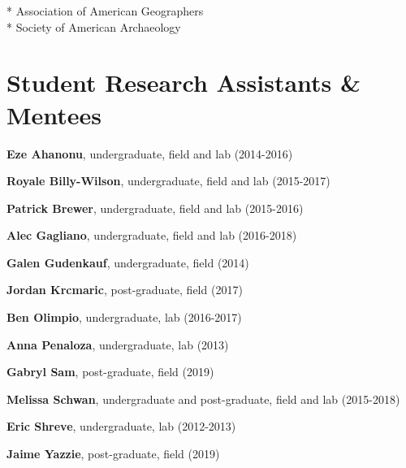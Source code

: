 \documentclass[11pt,a4paper,]{moderncv}
\begin{document}
\hspace*{0.333em}\hspace*{0.333em}\hspace*{0.333em}\hspace*{0.333em}\hspace*{0.333em}\hspace*{0.333em}\hspace*{0.333em}\hspace*{0.333em}\hspace*{0.333em}\hspace*{0.333em}*
Association of American Geographers\\
\hspace*{0.333em}\hspace*{0.333em}\hspace*{0.333em}\hspace*{0.333em}\hspace*{0.333em}\hspace*{0.333em}\hspace*{0.333em}\hspace*{0.333em}\hspace*{0.333em}\hspace*{0.333em}*
Society of American Archaeology

\vspace{12pt}

\hypertarget{student-research-assistants-mentees}{%
\section{Student Research Assistants \&
Mentees}\label{student-research-assistants-mentees}}

\begingroup
\setlength{\parindent}{-0.5in}
\setlength{\leftskip}{1.0in}

\textbf{Eze Ahanonu}, undergraduate, field and lab (2014-2016)

\textbf{Royale Billy-Wilson}, undergraduate, field and lab (2015-2017)

\textbf{Patrick Brewer}, undergraduate, field and lab (2015-2016)

\textbf{Alec Gagliano}, undergraduate, field and lab (2016-2018)

\textbf{Galen Gudenkauf}, undergraduate, field (2014)

\textbf{Jordan Krcmaric}, post-graduate, field (2017)

\textbf{Ben Olimpio}, undergraduate, lab (2016-2017)

\textbf{Anna Penaloza}, undergraduate, lab (2013)

\textbf{Gabryl Sam}, post-graduate, field (2019)

\textbf{Melissa Schwan}, undergraduate and post-graduate, field and lab
(2015-2018)

\textbf{Eric Shreve}, undergraduate, lab (2012-2013)

\textbf{Jaime Yazzie}, post-graduate, field (2019)

\endgroup

\vspace{12pt}
\end{document}
